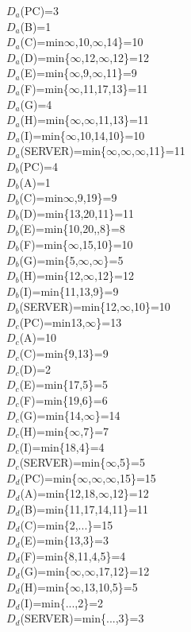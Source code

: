 \documentclass{article}
\begin{document}
$D_a$(PC)=3\\
$D_a$(B)=1\\
$D_a$(C)=min{$\infty$,10,$\infty$,14\}=10\\
$D_a$(D)=min\{$\infty$,12,$\infty$,12\}=12\\
$D_a$(E)=min\{$\infty$,9,$\infty$,11\}=9\\
$D_a$(F)=min\{$\infty$,11,17,13\}=11\\
$D_a$(G)=4\\
$D_a$(H)=min\{$\infty$,$\infty$,11,13\}=11\\
$D_a$(I)=min\{$\infty$,10,14,10\}=10\\
$D_a$(SERVER)=min\{$\infty$,$\infty$,$\infty$,11\}=11\\

$D_b$(PC)=4\\
$D_b$(A)=1\\
$D_b$(C)=min{$\infty$,9,19\}=9\\
$D_b$(D)=min\{13,20,11\}=11\\
$D_b$(E)=min\{10,20,,8\}=8\\
$D_b$(F)=min\{$\infty$,15,10\}=10\\
$D_b$(G)=min\{5,$\infty$,$\infty$\}=5\\
$D_b$(H)=min\{12,$\infty$,12\}=12\\
$D_b$(I)=min\{11,13,9\}=9\\
$D_b$(SERVER)=min\{12,$\infty$,10\}=10\\

$D_c$(PC)=min{13,$\infty$\}=13\\
$D_c$(A)=10\\
$D_c$(C)=min\{9,13\}=9\\
$D_c$(D)=2\\
$D_c$(E)=min\{17,5\}=5\\
$D_c$(F)=min\{19,6\}=6\\
$D_c$(G)=min\{14,$\infty$\}=14\\
$D_c$(H)=min\{$\infty$,7\}=7\\
$D_c$(I)=min\{18,4\}=4\\
$D_c$(SERVER)=min\{$\infty$,5\}=5\\

$D_d$(PC)=min\{$\infty$,$\infty$,$\infty$,15\}=15\\
$D_d$(A)=min\{12,18,$\infty$,12\}=12\\
$D_d$(B)=min\{11,17,14,11\}=11\\
$D_d$(C)=min\{2,...\}=15\\
$D_d$(E)=min\{13,3\}=3\\
$D_d$(F)=min\{8,11,4,5\}=4\\
$D_d$(G)=min\{$\infty$,$\infty$,17,12\}=12\\
$D_d$(H)=min\{$\infty$,13,10,5\}=5\\
$D_d$(I)=min\{...,2\}=2\\
$D_d$(SERVER)=min\{...,3\}=3\\

}}}
\end{document}
